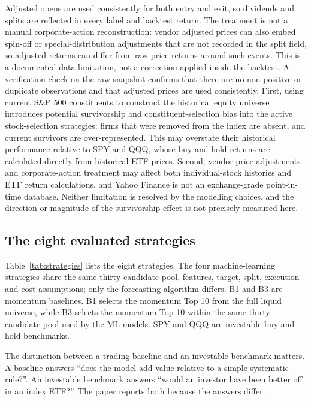 \documentclass[11pt,a4paper]{article}
\begin{document}
Adjusted opens are used consistently for both entry and exit, so dividends and splits are reflected in every label and backtest return. The treatment is not a manual corporate-action reconstruction: vendor adjusted prices can also embed spin-off or special-distribution adjustments that are not recorded in the split field, so adjusted returns can differ from raw-price returns around such events. This is a documented data limitation, not a correction applied inside the backtest. A verification check on the raw snapshot confirms that there are no non-positive or duplicate observations and that adjusted prices are used consistently. First, using current S\&P 500 constituents to construct the historical equity universe introduces potential survivorship and constituent-selection bias into the active stock-selection strategies: firms that were removed from the index are absent, and current survivors are over-represented. This may overstate their historical performance relative to SPY and QQQ, whose buy-and-hold returns are calculated directly from historical ETF prices. Second, vendor price adjustments and corporate-action treatment may affect both individual-stock histories and ETF return calculations, and Yahoo Finance is not an exchange-grade point-in-time database. Neither limitation is resolved by the modelling choices, and the direction or magnitude of the survivorship effect is not precisely measured here.

\subsection{The eight evaluated strategies}

Table~\ref{tab:strategies} lists the eight strategies. The four machine-learning strategies share the same thirty-candidate pool, features, target, split, execution and cost assumptions; only the forecasting algorithm differs. B1 and B3 are momentum baselines. B1 selects the momentum Top 10 from the full liquid universe, while B3 selects the momentum Top 10 within the same thirty-candidate pool used by the ML models. SPY and QQQ are investable buy-and-hold benchmarks.

The distinction between a trading baseline and an investable benchmark matters. A baseline answers ``does the model add value relative to a simple systematic rule?''. An investable benchmark answers ``would an investor have been better off in an index ETF?''. The paper reports both because the answers differ.


\end{document}
